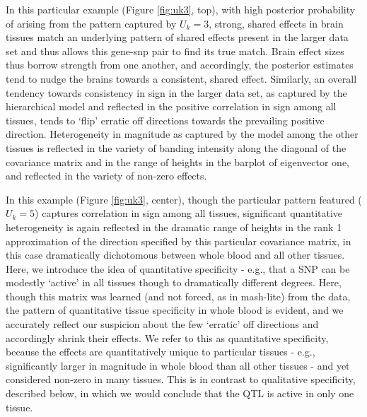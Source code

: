 In this particular example (Figure \ref{fig:uk3}, top), with high posterior probability of arising from the pattern captured by $U_{k}=3$, strong, shared effects in brain tissues match an underlying pattern of shared effects present in the larger data set and thus allows this gene-snp pair to find its true match. Brain effect sizes thus borrow strength from one another, and accordingly, the posterior estimates tend to nudge the brains towards a consistent, shared effect. Similarly, an overall tendency towards consistency in sign in the larger data set, as captured by the hierarchical model and reflected in the positive correlation in sign among all tissues, tends to `flip' erratic off directions towards the prevailing positive direction. Heterogeneity in magnitude as captured by the model among the other tissues is reflected in the variety of banding intensity along the diagonal of the covariance matrix and in the range of heights in the barplot of eigenvector one, and reflected in the variety of non-zero effects. 

In this example (Figure \ref{fig:uk3}, center), though the particular pattern featured ($U_{k}=5$) captures correlation in sign among all tissues, significant quantitative heterogeneity is again reflected in the dramatic range of heights in the rank 1 approximation of the direction specified by this particular covariance matrix, in this case dramatically dichotomous between whole blood and all other tissues. Here, we introduce the idea of quantitative specificity - e.g., that a SNP can be modestly `active' in all tissues though to dramatically different degrees. Here, though this matrix was learned (and not forced, as in mash-lite) from the data, the pattern of quantitative tissue specificity in %
whole blood is evident, and we accurately reflect our suspicion about the few `erratic' off directions and accordingly shrink their effects. %
We refer to this as quantitative specificity, because the effects are quantitatively unique to particular tissues - e.g., significantly larger in magnitude in whole blood than all other tissues - and yet considered non-zero in many tissues. This is in contrast to qualitative specificity, described below, in which we would conclude that the QTL is active in only one tissue. 




